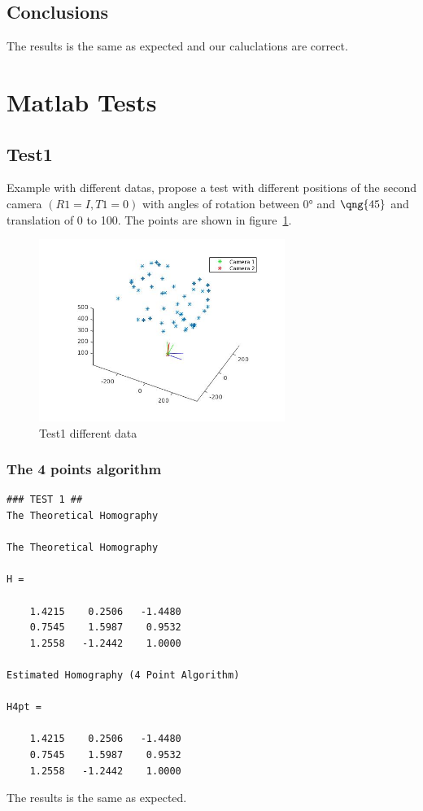 \documentclass[a4paper,12pt]{article}
\begin{document}
\subsection{Conclusions}
The results is the same as expected and our caluclations are correct.

\section{Matlab Tests}
\subsection{Test1}
Example with different datas, propose a test with different positions of the
second camera $(R1 = I, T1 = 0)$ with angles of rotation between $\ang{0}$ and $\qng{45}$ and
translation of 0 to 100. The points are shown in figure~\ref{fig:points-t1}.

\begin{figure}[tb]
         \centering
         \includegraphics[width=8cm]{Images/points3D.png}
         \caption{Test1 different data}
 	\label{fig:points-t1}
\end{figure}

\subsubsection{The 4 points algorithm}
\begin{verbatim}
### TEST 1 ##
The Theoretical Homography

The Theoretical Homography

H =

    1.4215    0.2506   -1.4480
    0.7545    1.5987    0.9532
    1.2558   -1.2442    1.0000

Estimated Homography (4 Point Algorithm)

H4pt =

    1.4215    0.2506   -1.4480
    0.7545    1.5987    0.9532
    1.2558   -1.2442    1.0000
\end{verbatim}
The results is the same as expected.
\end{document}
